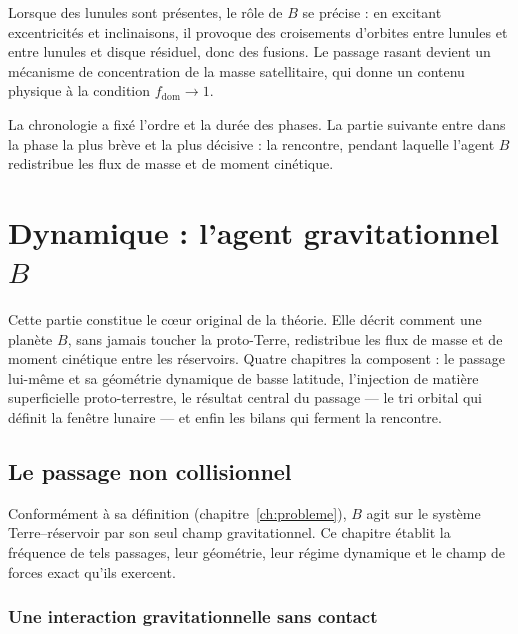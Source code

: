\documentclass[11pt,a4paper,openany]{report}
\begin{document}
\begin{lecture}
Lorsque des lunules sont présentes, le rôle de $B$ se précise : en excitant excentricités et inclinaisons, il provoque
des croisements d'orbites entre lunules et entre lunules et disque résiduel, donc des fusions.
Le passage rasant devient un mécanisme de concentration de la masse satellitaire, qui donne un
contenu physique à la condition $f_{\mathrm{dom}}\to1$.
\end{lecture}


\begin{rappel}
La chronologie a fixé l'ordre et la durée des phases. La partie suivante entre dans la phase la plus
brève et la plus décisive : la rencontre, pendant laquelle l'agent $B$ redistribue les flux de masse
et de moment cinétique.
\end{rappel}

\part{Dynamique : l'agent gravitationnel \texorpdfstring{$B$}{B}}
\label{part:dynamique}

\noindent
Cette partie constitue le c\oe ur original de la théorie. Elle décrit comment une planète $B$,
sans jamais toucher la proto-Terre, redistribue les flux de masse et de moment cinétique entre les
réservoirs. Quatre chapitres la composent : le passage lui-même et sa géométrie dynamique de basse latitude,
l'injection de matière superficielle proto-terrestre, le résultat central du passage --- le tri
orbital qui définit la fenêtre lunaire --- et enfin les bilans qui ferment la rencontre.

\chapter{Le passage non collisionnel}
\label{ch:passage}\label{sec:passage}

Conformément à sa définition (chapitre~\ref{ch:probleme}), $B$ agit sur le système
Terre--réservoir par son seul champ gravitationnel. Ce chapitre établit la fréquence de tels
passages, leur géométrie, leur régime dynamique et le champ de forces exact qu'ils exercent.

\section{Une interaction gravitationnelle sans contact}
\end{document}

